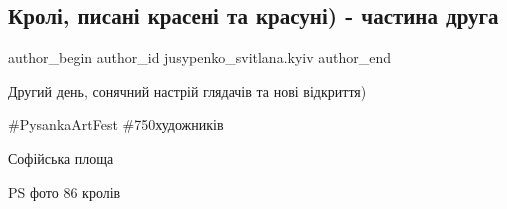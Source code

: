  
 
 
 
 
 
\subsection{Кролі, писані красені та красуні) - частина друга}
\label{sec:06_04_2018.fb.jusypenko_svitlana.kyiv.1.kroli_kraseni_2}
 
\ifcmt
 author_begin
   author_id jusypenko_svitlana.kyiv
 author_end
\fi

Другий день, сонячний настрій глядачів та нові відкриття) 

\#PysankaArtFest \#750художників 

Софійська площа 

PS фото 86 кролів

